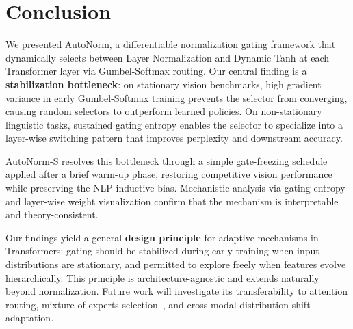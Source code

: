 \documentclass[final,3p,times,twocolumn]{elsarticle}
\begin{document}
\section{Conclusion}

We presented AutoNorm, a differentiable normalization gating framework
that dynamically selects between Layer Normalization and Dynamic Tanh
at each Transformer layer via Gumbel-Softmax routing. Our central
finding is a \textbf{stabilization bottleneck}: on stationary vision
benchmarks, high gradient variance in early Gumbel-Softmax training
prevents the selector from converging, causing random selectors to
outperform learned policies. On non-stationary linguistic tasks,
sustained gating entropy enables the selector to specialize into a
layer-wise switching pattern that improves perplexity and downstream
accuracy.

AutoNorm-S resolves this bottleneck through a simple gate-freezing
schedule applied after a brief warm-up phase, restoring competitive
vision performance while preserving the NLP inductive bias. Mechanistic
analysis via gating entropy and layer-wise weight visualization
confirm that the mechanism is interpretable and theory-consistent.

Our findings yield a general \textbf{design principle} for adaptive
mechanisms in Transformers: gating should be stabilized during early
training when input distributions are stationary, and permitted to
explore freely when features evolve hierarchically. This principle is
architecture-agnostic and extends naturally beyond normalization.
Future work will investigate its transferability to attention routing,
mixture-of-experts selection~\cite{shazeer2017outrageously}, and
cross-modal distribution shift adaptation.
\end{document}

